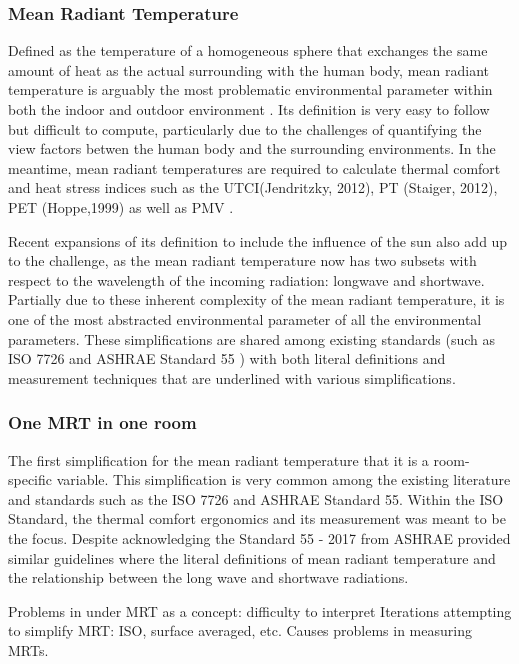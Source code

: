 \subsubsection{Mean Radiant Temperature}
    Defined as the temperature of a homogeneous sphere that exchanges the same amount of heat as the actual surrounding with the human body, mean radiant temperature is arguably the most problematic environmental parameter within both the indoor and outdoor environment \cite{kantor_most_2011}. Its definition is very easy to follow but difficult to compute, particularly due to the challenges of quantifying the view factors betwen the human body and the surrounding environments. In the meantime, mean radiant temperatures are required to calculate thermal comfort and heat stress indices such as the UTCI(Jendritzky, 2012), PT (Staiger, 2012), PET (Hoppe,1999) as well as PMV \cite{fanger_calculation_1967}. 

    Recent expansions of its definition to include the influence of the sun also add up to the challenge, as the mean radiant temperature now has two subsets with respect to the wavelength of the incoming radiation: longwave and shortwave\cite{ansi/ashrae_standard_2017}. Partially due to these inherent complexity of the mean radiant temperature, it is one of the most abstracted environmental parameter of all the environmental parameters. These simplifications are shared among existing standards (such as ISO 7726 \cite{standardization_iso7726_2001} and ASHRAE Standard 55 \cite{ansi/ashrae_standard_2017}) with both literal definitions and measurement techniques that are underlined with various simplifications. 
\subsubsection{One MRT in one room}
    The first simplification for the mean radiant temperature that it is a room-specific variable. This simplification is very common among the existing literature and standards such as the ISO 7726\cite{standardization_iso7726_2001} and ASHRAE Standard 55. Within the ISO Standard, the thermal comfort ergonomics and its measurement was meant to be the focus. Despite acknowledging the  Standard 55 - 2017 from ASHRAE provided similar guidelines where the literal definitions of mean radiant temperature and the relationship between the long wave and shortwave radiations. 

            Problems in under MRT as a concept: difficulty to interpret Iterations attempting to simplify MRT: ISO, surface averaged, etc. Causes problems in measuring MRTs.

